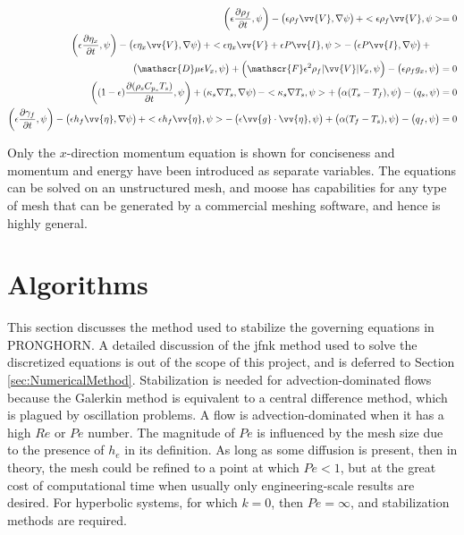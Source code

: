 \documentclass[10pt]{article}
\numberwithin{equation}{section} %
\begin{document}
\begin{equation}
\label{eq:PronghornEquations_V2WeakForm}
\begin{aligned}
\left(\epsilon \frac{\partial\rho_f}{\partial t},\psi\right)-\left(\epsilon\rho_f\vv{V},\nabla\psi\right)+< \epsilon\rho_f\vv{V},\psi>=0\\
\left(\epsilon\frac{\partial\eta_x}{\partial t},\psi\right)-\left(\epsilon\eta_x\vv{V},\nabla\psi\right)+<\epsilon\eta_x\vv{V} + \epsilon P\vv{I},\psi>-\left(\epsilon P\vv{I},\nabla\psi\right)+\hspace{1cm}\\
\left(\mathscr{D}\mu\epsilon V_x,\psi\right)+\left(\mathscr{F}\epsilon^2\rho_f|\vv{V}|V_x,\psi\right)-\left(\epsilon\rho_f g_x,\psi\right)=0\\
\left((1-\epsilon)\frac{\partial(\rho_s C_{p_s}T_s)}{\partial t},\psi\right)+\left(\kappa_s\nabla T_s,\nabla\psi\right)-<\kappa_s\nabla T_s,\psi>+\left(\alpha(T_s-T_f),\psi\right)-\left(q_s,\psi\right)=0\\
\left(\epsilon\frac{\partial\gamma_f}{\partial t},\psi\right)-\left(\epsilon h_f\vv{\eta},\nabla\psi\right)+<\epsilon h_f\vv{\eta},\psi>-\left(\epsilon\vv{g}\cdot\vv{\eta},\psi\right)+\left(\alpha(T_f-T_s),\psi\right)-\left(q_f,\psi\right)=0\\
\end{aligned}
\end{equation}

Only the \(x\)-direction momentum equation is shown for conciseness and momentum and energy have been introduced as separate variables. The equations can be solved on an unstructured mesh, and \gls{moose} has capabilities for any type of mesh that can be generated by a commercial meshing software, and hence is highly general.

\section{Algorithms}

This section discusses the method used to stabilize the governing equations in PRONGHORN. A detailed discussion of the \gls{jfnk} method used to solve the discretized equations is out of the scope of this project, and is deferred to Section \ref{sec:NumericalMethod}. Stabilization is needed for advection-dominated flows because the Galerkin method is equivalent to a central difference method, which is plagued by oscillation problems. A flow is advection-dominated when it has a high \(Re\) or \(Pe\) number. The magnitude of \(Pe\) is influenced by the mesh size due to the presence of \(h_e\) in its definition. As long as some diffusion is present, then in theory, the mesh could be refined to a point at which \(Pe<1\), but at the great cost of computational time when usually only engineering-scale results are desired. For hyperbolic systems, for which \(k=0\), then \(Pe=\infty\), and stabilization methods are required. 
\end{document}
